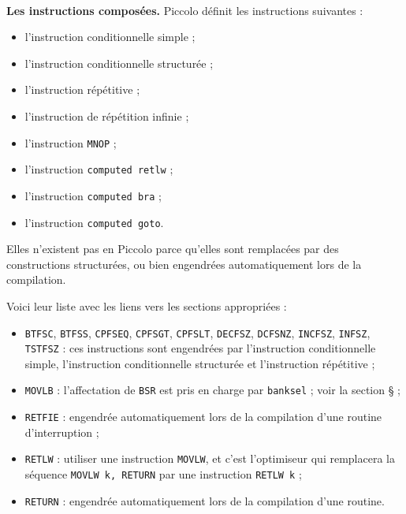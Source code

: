 ~\\
\textbf{Les instructions composées.} Piccolo définit les instructions suivantes :
\begin{itemize}
  \item l’instruction conditionnelle simple ;
  \item l’instruction conditionnelle structurée ;
  \item l’instruction répétitive ;
  \item l’instruction de répétition infinie ;
  \item l’instruction \texttt{MNOP} ;
  \item l’instruction \texttt{computed retlw} ;
  \item l’instruction \texttt{computed bra} ;
  \item l’instruction \texttt{computed goto}.
\end{itemize}





Elles n’existent pas en Piccolo parce qu’elles sont remplacées par des constructions structurées, ou bien engendrées automatiquement lors de la compilation.

Voici leur liste avec les liens vers les sections appropriées :\begin{itemize}
  \item \texttt{BTFSC}, \texttt{BTFSS}, \texttt{CPFSEQ}, \texttt{CPFSGT}, \texttt{CPFSLT}, \texttt{DECFSZ}, \texttt{DCFSNZ}, \texttt{INCFSZ}, \texttt{INFSZ}, \texttt{TSTFSZ} : ces instructions sont engendrées par l’instruction conditionnelle simple, l’instruction conditionnelle structurée et l’instruction répétitive ;
  \item \texttt{MOVLB} : l’affectation de \texttt{BSR} est pris en charge par \texttt{banksel} ; voir la section § ;
  \item \texttt{RETFIE} : engendrée automatiquement lors de la compilation d’une routine d’interruption ;
  \item \texttt{RETLW} : utiliser une instruction \texttt{MOVLW}, et c’est l’optimiseur qui remplacera la séquence \texttt{MOVLW k, RETURN} par une instruction \texttt{RETLW k} ;
  \item \texttt{RETURN} : engendrée automatiquement lors de la compilation d’une routine.

\end{itemize}





